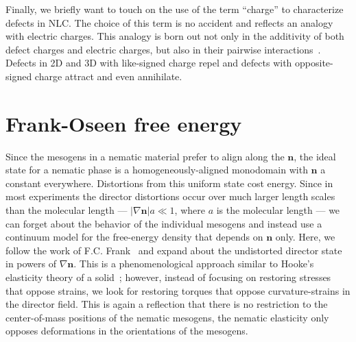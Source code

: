 Finally, we briefly want to touch on the use of the term ``charge'' to characterize defects in NLC.\@
The choice of this term is no accident and reflects an analogy with electric charges.
This analogy is born out not only in the additivity of both defect charges and electric charges, but also in their pairwise interactions~\cite{RN33,RN175,RN207}.
Defects in 2D and 3D with like-signed charge repel and defects with opposite-signed charge attract and even annihilate.




\section{Frank-Oseen free energy}
Since the mesogens in a nematic material prefer to align along the $\mathbf{n}$, the ideal state for a nematic phase is a homogeneously-aligned monodomain with $\mathbf{n}$ a constant everywhere.
Distortions from this uniform state cost energy.
Since in most experiments the director distortions occur over much larger length scales than the molecular length --- $|\nabla \mathbf{n}| a \ll 1$, where $a$ is the molecular length --- we can forget about the behavior of the individual mesogens and instead use a continuum model for the free-energy density that depends on $\mathbf{n}$ only.
Here, we follow the work of F.C. Frank~\cite{RN61} and expand about the undistorted director state in powers of $\nabla \mathbf{n}$.
This is a phenomenological approach similar to Hooke's elasticity theory of a solid~\cite{RN175,RN178}; however, instead of focusing on restoring stresses that oppose strains, we look for restoring torques that oppose curvature-strains in the director field.
This is again a reflection that there is no restriction to the center-of-mass positions of the nematic mesogens, the nematic elasticity only opposes deformations in the orientations of the mesogens.

